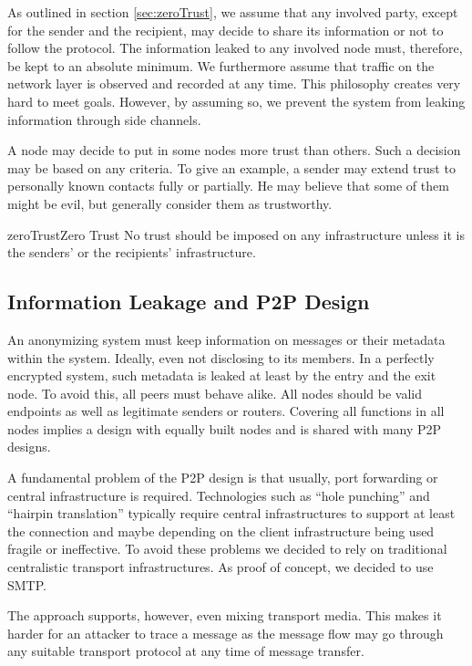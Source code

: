 As outlined in section \ref{sec:zeroTrust}, we assume that any involved party, except for the sender and the recipient, may decide to share its information or not to follow the protocol. The information leaked to any involved node must, therefore, be kept to an absolute minimum. We furthermore assume that traffic on the network layer is observed and recorded at any time. This philosophy creates very hard to meet goals. However, by assuming so, we prevent the system from leaking information through side channels.

A node may decide to put in some nodes more trust than others. Such a decision may be based on any criteria. To give an example, a sender may extend trust to personally known contacts fully or partially. He may believe that some of them might be evil, but generally consider them as trustworthy. 

\begin{requirement}{zeroTrust}{Zero Trust}
	No trust should be imposed on any infrastructure unless it is the senders' or the recipients' infrastructure.
\end{requirement}    

\subsection{Information Leakage and P2P Design}
An anonymizing system must keep information on messages or their metadata within the system. Ideally, even not disclosing to its members. In a perfectly encrypted system, such metadata is leaked at least by the entry and the exit node. To avoid this, all peers must behave alike. All nodes should be valid endpoints as well as legitimate senders or routers. Covering all functions in all nodes implies a design with equally built nodes and is shared with many P2P designs.

A fundamental problem of the P2P design is that usually, port forwarding or central infrastructure is required. Technologies such as ``hole punching'' and ``hairpin translation'' typically require central infrastructures to support at least the connection and maybe depending on the client infrastructure being used fragile or ineffective. To avoid these problems we decided to rely on traditional centralistic transport infrastructures. As proof of concept, we decided to use SMTP. 

The approach supports, however, even mixing transport media. This makes it harder for an attacker to trace a message as the message flow may go through any suitable transport protocol at any time of message transfer.

